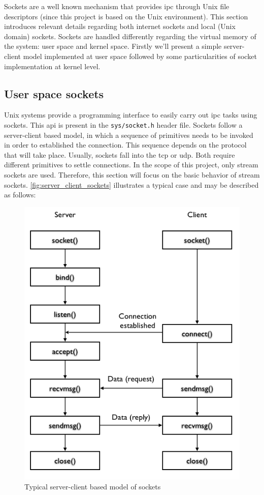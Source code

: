 Sockets are a well known mechanism that provides \gls{ipc} through Unix file descriptors (since this project is based on the Unix environment). This section introduces relevant details regarding both internet sockets and local (Unix domain) sockets. Sockets are handled differently regarding the virtual memory of the system: user space and kernel space. Firstly we'll present a simple server-client model implemented at user space followed by some particularities of socket implementation at kernel level.

\subsection{User space sockets}

Unix systems provide a programming interface to easily carry out \gls{ipc} tasks using sockets. This \gls{api} is present in the \texttt{sys/socket.h} header file. Sockets follow a server-client based model, in which a sequence of primitives needs to be invoked in order to established the connection. This sequence depends on the protocol that will take place. Usually, sockets fall into the \gls{tcp} or \gls{udp}. Both require different primitives to settle connections. In the scope of this project, only stream sockets are used. Therefore, this section will focus on the basic behavior of stream sockets. \autoref{fig:server_client_sockets} illustrates a typical case and may be described as follows:

\begin{figure}[h]
 \centering
 \includegraphics[scale=0.5]{figures/server_client_sockets.png}
 \caption{Typical server-client based model of sockets}
 \label{fig:server_client_sockets}
\end{figure}

